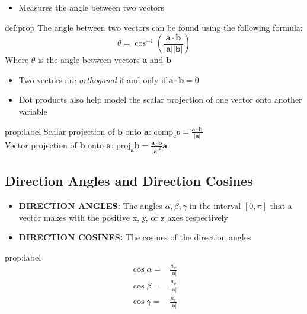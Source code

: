 \documentclass{package/notes}
\begin{document}
\begin{itemize}
	\item Measures the angle between two vectors
\end{itemize}

\begin{proposition}{def:prop}
	The angle between two vectors can be found using the following formula:
	$$\theta = \cos ^{-1}\left(\frac{\mathbf a \cdot \mathbf b}{|\mathbf a | |\mathbf b|}\right)$$
	Where $\theta$ is the angle between vectors $\mathbf{a}$ and $\mathbf{b}$
\end{proposition}

\begin{itemize}
	\item Two vectors are \textit{orthogonal} if and only if $\mathbf a \cdot \mathbf b = 0$ 
	\item Dot products also help model the scalar projection of one vector onto another variable
	\end{itemize}

\begin{proposition}{prop:label}
	Scalar projection of $\mathbf b$ onto $\mathbf a$: $\text{comp}_a b = \frac{\mathbf a \cdot \mathbf b}{|\mathbf a|}$ \\
	Vector projection of $\mathbf b$ onto $\mathbf a$: $\text{proj}_{\mathbf a}\mathbf b = \frac{\mathbf a \cdot \mathbf b}{|\mathbf a|^2}\mathbf a$
\end{proposition} %


\subsection{Direction Angles and Direction Cosines}

\begin{itemize}
	\item \textbf{DIRECTION ANGLES:} The angles $\alpha, \beta, \gamma$ in the interval $[0,\pi]$ that a vector makes with the positive x, y, or z axes respectively
	\item \textbf{DIRECTION COSINES:} The cosines of the direction angles
\end{itemize}

\begin{proposition}{prop:label}
	$$
	\begin{aligned}
		\cos \alpha =& \frac{a_x}{|\mathbf{a}|}\\
		\cos \beta =& \frac{a_y}{|\mathbf a|}\\
		\cos \gamma =& \frac{a_z}{|\mathbf a|}
	\end{aligned}
	$$
\end{proposition}
\end{document}
